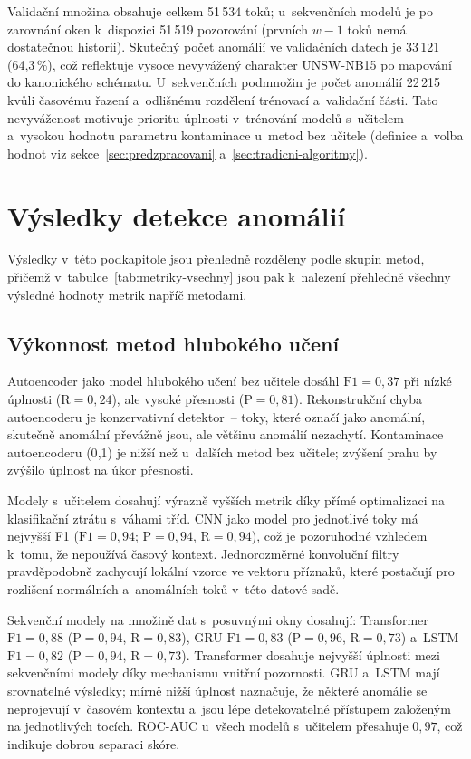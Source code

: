 Validační množina obsahuje celkem 51\,534 toků; u~sekvenčních modelů je po zarovnání oken k~dispozici 51\,519 pozorování (prvních $w-1$ toků nemá dostatečnou historii). Skutečný počet anomálií ve validačních datech je 33\,121 (64{,}3\,\%), což reflektuje vysoce nevyvážený charakter UNSW-NB15 po mapování do kanonického schématu. U~sekvenčních podmnožin je počet anomálií 22\,215 kvůli časovému řazení a~odlišnému rozdělení trénovací a~validační části. Tato nevyváženost motivuje prioritu úplnosti v~trénování modelů s~učitelem a~vysokou hodnotu parametru kontaminace u~metod bez učitele (definice a~volba hodnot viz sekce~\ref{sec:predzpracovani} a~\ref{sec:tradicni-algoritmy}).

\section{Výsledky detekce anomálií}
\label{sec:vysledky-detekce}

Výsledky v~této podkapitole jsou přehledně rozděleny podle skupin metod, přičemž v~tabulce~\ref{tab:metriky-vsechny} jsou pak k~nalezení přehledně všechny výsledné hodnoty metrik napříč metodami.

\subsection{Výkonnost metod hlubokého učení}
\label{sec:vykon-dl}

Autoencoder jako model hlubokého učení bez učitele dosáhl $\text{F1} = 0{,}37$ při nízké úplnosti ($\text{R} = 0{,}24$), ale vysoké přesnosti ($\text{P} = 0{,}81$). Rekonstrukční chyba autoencoderu je konzervativní detektor~-- toky, které označí jako anomální, skutečně anomální převážně jsou, ale většinu anomálií nezachytí. Kontaminace autoencoderu (0{,}1) je nižší než u~dalších metod bez učitele; zvýšení prahu by zvýšilo úplnost na úkor přesnosti.

Modely s~učitelem dosahují výrazně vyšších metrik díky přímé optimalizaci na klasifikační ztrátu s~váhami tříd. CNN jako model pro jednotlivé toky má nejvyšší F1 ($\text{F1} = 0{,}94$; $\text{P} = 0{,}94$, $\text{R} = 0{,}94$), což je pozoruhodné vzhledem k~tomu, že nepoužívá časový kontext. Jednorozměrné konvoluční filtry pravděpodobně zachycují lokální vzorce ve vektoru příznaků, které postačují pro rozlišení normálních a~anomálních toků v~této datové sadě.

Sekvenční modely na množině dat s~posuvnými okny dosahují: Transformer $\text{F1} = 0{,}88$ ($\text{P} = 0{,}94$, $\text{R} = 0{,}83$), GRU $\text{F1} = 0{,}83$ ($\text{P} = 0{,}96$, $\text{R} = 0{,}73$) a~LSTM $\text{F1} = 0{,}82$ ($\text{P} = 0{,}94$, $\text{R} = 0{,}73$). Transformer dosahuje nejvyšší úplnosti mezi sekvenčními modely díky mechanismu vnitřní pozornosti. GRU a~LSTM mají srovnatelné výsledky; mírně nižší úplnost naznačuje, že některé anomálie se neprojevují v~časovém kontextu a~jsou lépe detekovatelné přístupem založeným na jednotlivých tocích. ROC-AUC u~všech modelů s~učitelem přesahuje $0{,}97$, což indikuje dobrou separaci skóre.

